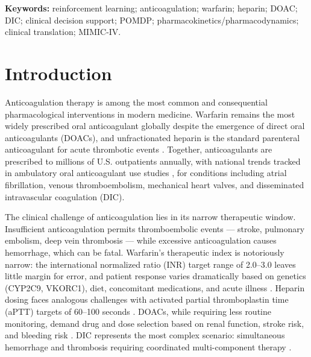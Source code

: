 \documentclass[11pt]{article}
\begin{document}
\begin{abstract}
silent deployment --- can be measured. We note that DOAC stroke-event rates fall outside trial confidence intervals for all three drugs (bleed rates are within CI) and are flagged for Phase~2 re-calibration.
\end{abstract}

\vspace{0.5em}
\noindent\textbf{Keywords:} reinforcement learning; anticoagulation; warfarin; heparin; DOAC; DIC; clinical decision support; POMDP; pharmacokinetics/pharmacodynamics; clinical translation; MIMIC-IV.
\vspace{0.5em}

\section{Introduction}
\label{sec:introduction}

Anticoagulation therapy is among the most common and consequential pharmacological interventions in modern medicine. Warfarin remains the most widely prescribed oral anticoagulant globally despite the emergence of direct oral anticoagulants (DOACs), and unfractionated heparin is the standard parenteral anticoagulant for acute thrombotic events \citep{hirsh2001}. Together, anticoagulants are prescribed to millions of U.S. outpatients annually, with national trends tracked in ambulatory oral anticoagulant use studies \citep{barnes2015}, for conditions including atrial fibrillation, venous thromboembolism, mechanical heart valves, and disseminated intravascular coagulation (DIC).

The clinical challenge of anticoagulation lies in its narrow therapeutic window. Insufficient anticoagulation permits thromboembolic events --- stroke, pulmonary embolism, deep vein thrombosis --- while excessive anticoagulation causes hemorrhage, which can be fatal. Warfarin's therapeutic index is notoriously narrow: the international normalized ratio (INR) target range of 2.0--3.0 leaves little margin for error, and patient response varies dramatically based on genetics (CYP2C9, VKORC1), diet, concomitant medications, and acute illness \citep{iwpc2009, johnson2017}. Heparin dosing faces analogous challenges with activated partial thromboplastin time (aPTT) targets of 60--100 seconds \citep{raschke1993}. DOACs, while requiring less routine monitoring, demand drug and dose selection based on renal function, stroke risk, and bleeding risk \citep{connolly2009, patel2011, granger2011}. DIC represents the most complex scenario: simultaneous hemorrhage and thrombosis requiring coordinated multi-component therapy \citep{levi1999, levi2009}.
\end{document}
